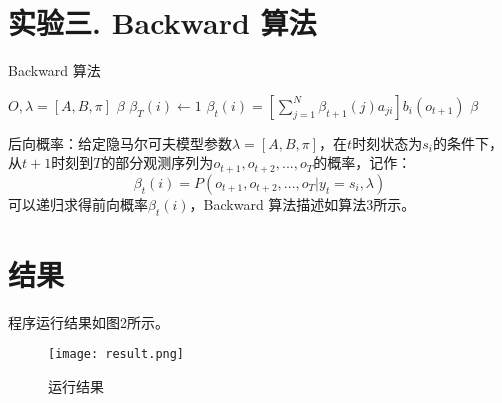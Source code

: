 \documentclass[a4paper,UTF8]{article}
\theoremstyle{definition}
\begin{document}
\section*{实验三. Backward 算法}
	\begin{algorithm}
		\caption{Backward 算法}
		\begin{algorithmic}[1]
			\REQUIRE $O,\lambda=[A, B, \pi]$
			\ENSURE $\beta$
			\STATE $\beta_{T}(i) \gets 1$
			\ENDFOR
			\STATE $ \beta_{t}(i) = [\sum_{j=1}^{N}\beta_{t+1}(j)a_{ji}]b_{i}(o_{t+1})$
			\ENDFOR
			\ENDFOR
			\RETURN $\beta$
		\end{algorithmic}
	\end{algorithm}
	后向概率\cite{tjffx}：给定隐马尔可夫模型参数$\lambda = [A, B, \pi]$，在$t$时刻状态为$s_{i}$的条件下，
	从$t+1$时刻到$T$的部分观测序列为$o_{t+1},o_{t+2},...,o_{T}$的概率，记作：
	$$\beta_{t}(i)=P(o_{t+1},o_{t+2},...,o_{T}|y_{t}=s_{i},\lambda)$$
	可以递归求得前向概率$\beta_{t}(i)$，Backward 算法描述如算法3所示。

\section*{结果}
	程序运行结果如图2所示。
	\begin{figure}[!htbp]
		\centering
		\texttt{[image: result.png]}
		\caption{运行结果}
	\end{figure}



\end{document}
